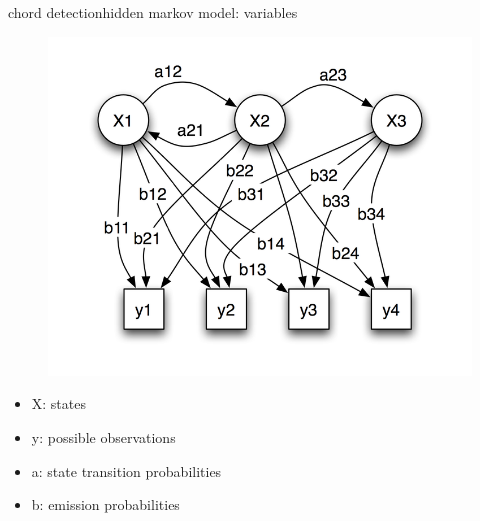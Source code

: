         \begin{frame}{chord detection}{hidden markov model: variables}
            \vspace{-5mm}
            \begin{figure}
                \centering
                    \includegraphics[scale=.25]{graph/HiddenMarkovModel}
            \end{figure}
            \vspace{-5mm}
            \begin{footnotesize}
                \begin{itemize}
                    \item	X: states
                    \item	y: possible observations
                    \item	a: state transition probabilities
                    \item	b: emission probabilities
                \end{itemize}
            \end{footnotesize}
        \end{frame}
